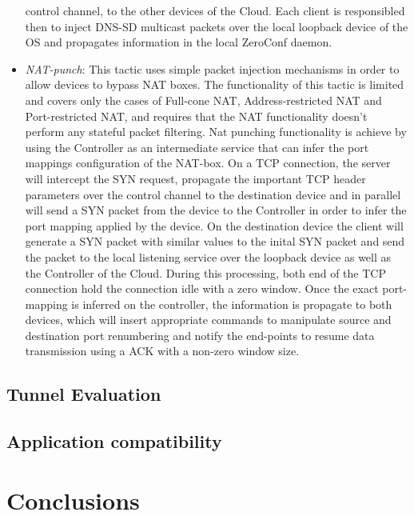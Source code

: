 \begin{itemize}
        control channel, to the other devices of the Cloud. Each \signpost
        client is responsibled then to
        inject DNS-SD multicast packets over the local loopback device of the OS
        and propagates information in the local ZeroConf daemon. 
  \item \emph{NAT-punch}: This tactic uses simple packet injection mechanisms in
        order to allow devices to bypass NAT boxes. The
        functionality of this tactic is limited and covers only the cases of
        Full-cone NAT, Address-restricted NAT and Port-restricted NAT, and
        requires that the NAT functionality doesn't perform any stateful packet
        filtering. Nat punching functionality is achieve by using the Controller as
        an intermediate service that can infer the port mappings configuration of
        the NAT-box. On a TCP connection, the server will intercept the SYN
        request, propagate the important TCP header parameters over the control
        channel to the destination device and in parallel will send a SYN packet
        from the device to the Controller in order to infer the port mapping
        applied by the device. On the destination device the \signpost client
        will generate a SYN packet with similar values to the inital SYN packet
        and send the packet to the local listening service over the loopback
        device as well as the Controller of the Cloud. During this processing,
        both end of the TCP connection hold the connection idle with a zero
        window. Once the exact port-mapping is inferred on the controller, the
        information is propagate to both devices, which will insert
        appropriate \of commands to manipulate source and destination port
        renumbering and notify the end-points to resume data transmission using
        a ACK with a non-zero window size.
\end{itemize}

\subsection{Tunnel Evaluation}

\subsection{Application compatibility}

\section{Conclusions}\label{sec:signpost-conclusion}

